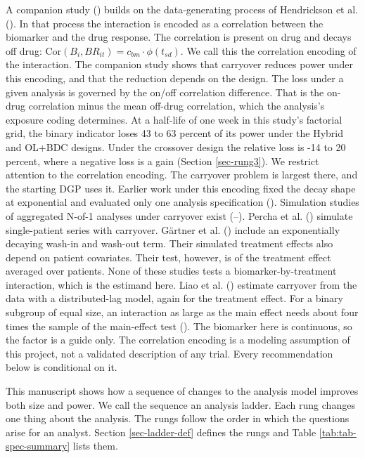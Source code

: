 \documentclass[
  11pt,
]{article}
\begin{document}
A companion study () builds on the
data-generating process of Hendrickson et al. ().
In that process the interaction is encoded as a correlation between
the biomarker and the drug response. The correlation is present on
drug and decays off drug: \(\text{Cor}(B_i, BR_{it}) = c_{bm} \cdot
\phi(t_{sd})\). We call this the correlation encoding of the
interaction. The companion study shows that carryover reduces power
under this encoding, and that the reduction depends on the design.
The loss under a given analysis is governed by the on/off correlation
difference. That is the on-drug correlation minus the mean off-drug
correlation, which the analysis's exposure coding determines. At a
half-life of one week in this study's factorial grid, the binary
indicator loses 43 to 63 percent of its power under the
Hybrid and OL+BDC designs. Under the crossover design the
relative loss is -14 to 20 percent, where a negative loss is a gain
(Section \ref{sec-rung3}). We restrict attention to the correlation
encoding. The carryover problem is largest there, and the starting DGP
uses it. Earlier work under this encoding fixed the decay shape at
exponential and evaluated only one analysis specification
(). Simulation studies of aggregated N-of-1 analyses
under carryover exist (--).
Percha et al. () simulate single-patient series with
carryover. Gärtner et al. () include an exponentially
decaying wash-in and wash-out term. Their simulated treatment effects
also depend on patient covariates. Their test, however, is of the
treatment effect averaged over patients. None of these studies tests
a biomarker-by-treatment interaction, which is the estimand here.
Liao et al. () estimate carryover from the data with a
distributed-lag model, again for the treatment effect. For a binary
subgroup of equal size, an interaction as large as the main effect
needs about four times the sample of the main-effect test
(). The biomarker here is continuous, so the factor is a
guide only. The correlation encoding is a modeling assumption of this
project, not a validated description of any trial. Every
recommendation below is conditional on it.

This manuscript shows how a sequence of changes to the analysis model
improves both size and power. We call the sequence an analysis ladder.
Each rung changes one thing about the analysis. The rungs follow the
order in which the questions arise for an analyst. Section
\ref{sec-ladder-def} defines the rungs and Table
\ref{tab:tab-spec-summary} lists them.
\end{document}
